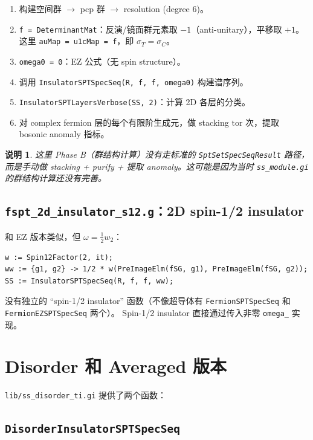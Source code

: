 \documentclass[a4paper,fontset=ubuntu,12pt]{ctexart}
\newtheorem{remark}[definition]{说明}
\newcommand{\aT}{\sigma_T}
\newcommand{\aC}{\sigma_C}
\begin{document}
\begin{enumerate}
\item 构建空间群 $\to$ pcp 群 $\to$ resolution (degree 6)。
\item \texttt{f = DeterminantMat}：反演/镜面群元素取 $-1$（anti-unitary），平移取 $+1$。
      这里 \texttt{auMap = u1cMap = f}，即 $\aT = \aC$。
\item \texttt{omega0 = 0}：EZ 公式（无 spin structure）。
\item 调用 \texttt{InsulatorSPTSpecSeq(R, f, f, omega0)} 构建谱序列。
\item \texttt{InsulatorSPTLayersVerbose(SS, 2)}：计算 2D 各层的分类。
\item 对 complex fermion 层的每个有限阶生成元，做 stacking $\mathrm{tor}$ 次，提取 bosonic anomaly 指标。
\end{enumerate}

\begin{remark}
这里 Phase B（群结构计算）没有走标准的 \texttt{SptSetSpecSeqResult} 路径，
而是手动做 stacking + purify + 提取 anomaly。这可能是因为当时 \texttt{ss\_module.gi} 的群结构计算还没有完善。
\end{remark}

\subsection{\texttt{fspt\_2d\_insulator\_s12.g}：2D spin-1/2 insulator}

和 EZ 版本类似，但 $\omega = \frac{1}{2} w_2$：
\begin{lstlisting}
w := Spin12Factor(2, it);
ww := {g1, g2} -> 1/2 * w(PreImageElm(fSG, g1), PreImageElm(fSG, g2));
SS := InsulatorSPTSpecSeq(R, f, f, ww);
\end{lstlisting}

没有独立的 ``spin-1/2 insulator'' 函数（不像超导体有 \texttt{FermionSPTSpecSeq} 和 \texttt{FermionEZSPTSpecSeq} 两个）。
Spin-1/2 insulator 直接通过传入非零 \texttt{omega\_} 实现。

\section{Disorder 和 Averaged 版本}
\label{sec:disorder}

\texttt{lib/ss\_disorder\_ti.gi} 提供了两个函数：

\subsection{\texttt{DisorderInsulatorSPTSpecSeq}}
\end{document}
